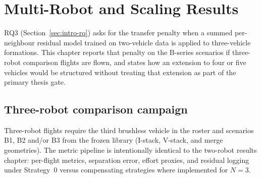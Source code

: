%
%
%

\chapter{Multi-Robot and Scaling Results}
\label{ch:results3}

RQ3 (Section~\ref{sec:intro-rq}) asks for the transfer penalty when a summed per-neighbour
residual model trained on two-vehicle data is applied to three-vehicle formations. This chapter
reports that penalty on the B-series scenarios if three-robot comparison flights are flown, and
states how an extension to four or five vehicles would be structured without treating that extension
as part of the primary thesis gate.

\section{Three-robot comparison campaign}
\label{sec:res3-campaign}

Three-robot flights require the third brushless vehicle in the roster and scenarios B1, B2 and/or
B3 from the frozen library (I-stack, V-stack, and merge geometries). The metric pipeline is
intentionally identical to the two-robot results chapter: per-flight metrics, separation error, effort
proxies, and residual logging under Strategy~0 versus compensating strategies where implemented
for $N=3$.

